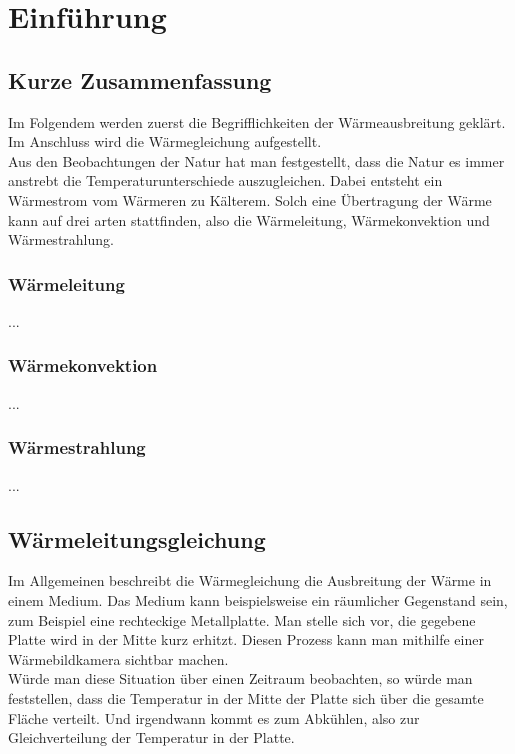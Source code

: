 \chapter{Einführung}
\label{cha:1}

\section{Kurze Zusammenfassung}

Im Folgendem werden zuerst die Begrifflichkeiten der Wärmeausbreitung geklärt. Im Anschluss wird die Wärmegleichung aufgestellt. \\

Aus den Beobachtungen der Natur hat man festgestellt, dass die Natur es immer anstrebt die Temperaturunterschiede auszugleichen. Dabei entsteht ein Wärmestrom vom Wärmeren zu Kälterem. Solch eine Übertragung der Wärme kann auf drei arten stattfinden, also die Wärmeleitung, Wärmekonvektion und Wärmestrahlung.

\subsection{Wärmeleitung}

...

\subsection{Wärmekonvektion}

...

\subsection{Wärmestrahlung}

...

\section{Wärmeleitungsgleichung}

Im Allgemeinen beschreibt die Wärmegleichung die Ausbreitung der Wärme in einem Medium. Das Medium kann beispielsweise ein räumlicher Gegenstand sein, zum Beispiel eine rechteckige Metallplatte. Man stelle sich vor, die gegebene Platte wird in der Mitte kurz erhitzt. Diesen Prozess kann man mithilfe einer Wärmebildkamera sichtbar machen.\\

Würde man diese Situation über einen Zeitraum beobachten, so würde man feststellen, dass die Temperatur in der Mitte der Platte sich über die gesamte Fläche verteilt. Und irgendwann kommt es zum Abkühlen, also zur Gleichverteilung der Temperatur in der Platte.\\


